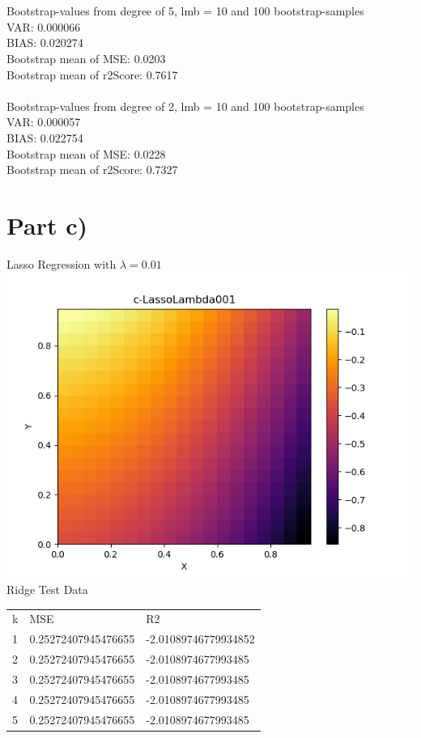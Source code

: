 \documentclass[a4paper,norsk]{article}
\begin{document}
\\
\\Bootstrap-values from degree of 5, lmb = 10 and 100 bootstrap-samples
\\VAR: 0.000066
\\BIAS: 0.020274
\\Bootstrap mean of MSE: 0.0203
\\Bootstrap mean of r2Score: 0.7617
\\
\\Bootstrap-values from degree of 2, lmb = 10 and 100 bootstrap-samples
\\VAR: 0.000057
\\BIAS: 0.022754
\\Bootstrap mean of MSE: 0.0228
\\Bootstrap mean of r2Score: 0.7327

\clearpage

\section*{Part c)}
Lasso Regression with $\lambda = 0.01$
\\ \includegraphics[scale=.7]{c-LassoLambda001}
\\Ridge Test Data
\begin{table}[!h]
\begin{tabular}{lll}
k & MSE                   & R2                 \\
1 & 0.25272407945476655  & -2.01089746779934852 \\
2 & 0.25272407945476655  & -2.0108974677993485 \\
3 & 0.25272407945476655  & -2.0108974677993485 \\
4 & 0.25272407945476655  & -2.0108974677993485 \\
5 & 0.25272407945476655 & -2.0108974677993485
\end{tabular}
\end{table}
\end{document}
